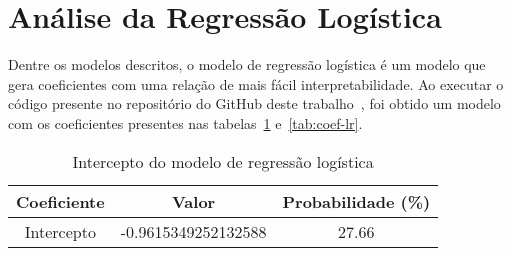 \section{Análise da Regressão Logística}
\label{sec:analise-da-regressao-logistica}

Dentre os modelos descritos, o modelo de regressão logística é um modelo que gera coeficientes com uma relação de mais fácil interpretabilidade.
Ao executar o código presente no repositório do GitHub deste trabalho~\cite{githubtcc}, foi obtido um modelo com os coeficientes presentes nas tabelas~\ref{tab:int-lr} e~\ref{tab:coef-lr}.

\begin{table}[h]
    \centering
    \begin{tabular}{|c|c|c|}
        \hline
        Coeficiente & Valor               & Probabilidade (\%) \\ \hline
        Intercepto  & -0.9615349252132588 & 27.66              \\ \hline
    \end{tabular}
    \caption{Intercepto do modelo de regressão logística}
    \label{tab:int-lr}
\end{table}

